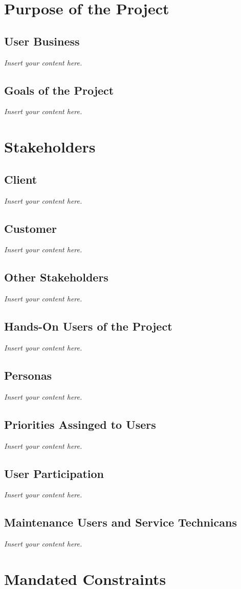 \documentclass[a4paper, 12pt,twoside]{article}
\newcommand{\lips}{\textit{Insert your content here.}}
\begin{document}
	
\newpage

\section{Purpose of the Project}
\subsection{User Business}
\lips
\subsection{Goals of the Project}
\lips
\section{Stakeholders}
\subsection{Client}
\lips
\subsection{Customer}
\lips
\subsection{Other Stakeholders}
\lips
\subsection{Hands-On Users of the Project}
\lips
\subsection{Personas}
\lips
\subsection{Priorities Assinged to Users}
\lips
\subsection{User Participation}
\lips
\subsection{Maintenance Users and Service Technicans}
\lips

\section{Mandated Constraints}
\end{document}

